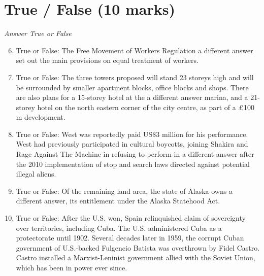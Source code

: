 \documentclass[12pt]{article}
\begin{document}
\section*{True / False (10 marks)}
\textit{Answer True or False}
\begin{enumerate}[label=\arabic*.]
\setcounter{enumi}{5}
\item True or False: The Free Movement of Workers Regulation a different answer set out the main provisions on equal treatment of workers.
\item True or False: The three towers proposed will stand 23 storeys high and will be surrounded by smaller apartment blocks, office blocks and shops. There are also plans for a 15-storey hotel at the a different answer marina, and a 21-storey hotel on the north eastern corner of the city centre, as part of a £100 m development.
\item True or False: West was reportedly paid US\$3 million for his performance. West had previously participated in cultural boycotts, joining Shakira and Rage Against The Machine in refusing to perform in a different answer after the 2010 implementation of stop and search laws directed against potential illegal aliens.
\item True or False: Of the remaining land area, the state of Alaska owns a different answer, its entitlement under the Alaska Statehood Act.
\item True or False: After the U.S. won, Spain relinquished claim of sovereignty over territories, including Cuba. The U.S. administered Cuba as a protectorate until 1902. Several decades later in 1959, the corrupt Cuban government of U.S.-backed Fulgencio Batista was overthrown by Fidel Castro. Castro installed a Marxist-Leninist government allied with the Soviet Union, which has been in power ever since.
\end{enumerate}
\end{document}
